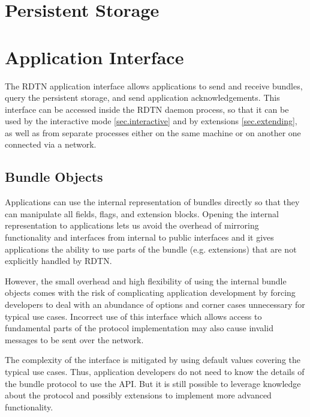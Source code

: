 \documentclass{article}
\begin{document}
\section{Persistent Storage}\label{sec.storage}

\section{Application Interface}\label{sec.appif}

The RDTN application interface allows applications to send and receive bundles,
query the persistent storage, and send application acknowledgements. This
interface can be accessed inside the RDTN daemon process, so that it can be used
by the interactive mode \ref{sec.interactive} and by extensions
\ref{sec.extending}, as well as from separate processes either on the same
machine or on another one connected via a network.

\subsection{Bundle Objects}\label{sec.bundle-obj}

Applications can use the internal representation of bundles directly so that
they can manipulate all fields, flags, and extension blocks. Opening the
internal representation to applications lets us avoid the overhead of mirroring
functionality and interfaces from internal to public interfaces and it gives
applications the ability to use parts of the bundle (e.g. extensions) that are
not explicitly handled by RDTN.

However, the small overhead and high flexibility of using the internal bundle
objects comes with the risk of complicating application development by forcing
developers to deal with an abundance of options and corner cases unnecessary for
typical use cases. Incorrect use of this interface which allows access to
fundamental parts of the protocol implementation may also cause invalid messages
to be sent over the network.

The complexity of the interface is mitigated by using default values covering the
typical use cases. Thus, application developers do not need to know the details
of the bundle protocol to use the API. But it is still possible to leverage
knowledge about the protocol and possibly extensions to implement more advanced
functionality.
\end{document}
